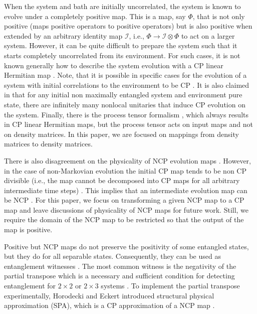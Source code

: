 \documentclass[12pt]{iopart}
\begin{document}
When the system and bath are initially uncorrelated, the system is known to evolve under a completely positive map.  This is a map, say $\Phi$, that is not only positive (maps positive operators to positive operators) but is also positive when extended by an arbitrary identity map $\mathcal{I}$, i.e., $\Phi\rightarrow \mathcal{I}\otimes\Phi$ to act on a larger system. However, it can be quite difficult to prepare the system such that it starts completely uncorrelated from its environment. For such cases, it is not known generally how to describe the system evolution with a CP linear Hermitian map \cite{Pechukas_1994, Alicki_1995, Pechukas_1995, Jordan_Shaji_Sudarshan_2004, Shaji_Sudarshan_2005}. Note, that it is possible in specific cases for the evolution of a system with initial correlations to the environment to be CP \cite{liu2014CPMaps, Rodriguez_Rosario_2008, Modi_2012OperationalApproachToOpenDyn}. It is also claimed in \cite{Jagadish_2021_InitialEntEntUnitariesAndCPMaps} that for any initial non maximally entangled system and environment pure state, there are infinitely many nonlocal unitaries that induce CP evolution on the system. Finally, there is the process tensor formalism \cite{Pollock_2018NonMarkovQuantProccCompleteFrameAndEfficCharac, Modi_2012OperationalApproachToOpenDyn}, which always results in CP linear Hermitian maps, but the process tensor acts on input maps and not on density matrices. In this paper, we are focused on mappings from density matrices to density matrices.


There is also disagreement on the physicality of NCP evolution maps \cite{allen2017Causal, Schmid_Ried_Spekkens_2018}. However, in the case of non-Markovian evolution the initial CP map tends to be non CP divisible (i.e., the map cannot be decomposed into CP maps for all arbitrary intermediate time steps) \cite{Pollock_2018NonMarkovQuantProccCompleteFrameAndEfficCharac}. This implies that an intermediate evolution map can be NCP \cite{Milz_2019CPDivisibilityDoesNotMeanMarkov}. For this paper, we focus on transforming a given NCP map to a CP map and leave discussions of physicality of NCP maps for future work. Still, we require the domain of the NCP map to be restricted so that the output of the map is positive.



Positive but NCP maps do not preserve the positivity of some entangled states, but they do for all separable states. Consequently, they can be used as entanglement witnesses \cite{Horodecki_2009_QuantumEntanglement}. The most common witness is the negativity of the partial transpose which is a necessary and sufficient condition for detecting entanglement for $2\times 2$ or $2\times 3$ systems \cite{Peres,horodcecki1996SepOfMixedStsNecAndSuffCond}. To implement the partial transpose experimentally, Horodecki and Eckert introduced structural physical approximation (SPA), which is a CP approximation of a NCP map \cite{Horodecki_Ekert_2002}.
\end{document}
